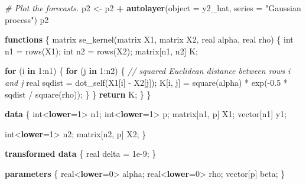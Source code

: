 \documentclass[
]{article}
\newenvironment{Shaded}{\begin{snugshade}}{\end{snugshade}}
\newcommand{\AttributeTok}[1]{\textcolor[rgb]{0.13,0.29,0.53}{#1}}
\newcommand{\CommentTok}[1]{\textcolor[rgb]{0.56,0.35,0.01}{\textit{#1}}}
\newcommand{\ControlFlowTok}[1]{\textcolor[rgb]{0.13,0.29,0.53}{\textbf{#1}}}
\newcommand{\DataTypeTok}[1]{\textcolor[rgb]{0.13,0.29,0.53}{#1}}
\newcommand{\DecValTok}[1]{\textcolor[rgb]{0.00,0.00,0.81}{#1}}
\newcommand{\FloatTok}[1]{\textcolor[rgb]{0.00,0.00,0.81}{#1}}
\newcommand{\FunctionTok}[1]{\textcolor[rgb]{0.13,0.29,0.53}{\textbf{#1}}}
\newcommand{\KeywordTok}[1]{\textcolor[rgb]{0.13,0.29,0.53}{\textbf{#1}}}
\newcommand{\NormalTok}[1]{#1}
\newcommand{\OtherTok}[1]{\textcolor[rgb]{0.56,0.35,0.01}{#1}}
\newcommand{\SpecialCharTok}[1]{\textcolor[rgb]{0.81,0.36,0.00}{\textbf{#1}}}
\newcommand{\StringTok}[1]{\textcolor[rgb]{0.31,0.60,0.02}{#1}}
\begin{document}
\begin{Shaded}
\begin{Highlighting}[]
\CommentTok{\# Plot the forecasts.}
\NormalTok{p2 }\OtherTok{\textless{}{-}}\NormalTok{ p2 }\SpecialCharTok{+} \FunctionTok{autolayer}\NormalTok{(}\AttributeTok{object =}\NormalTok{ y2\_hat, }\AttributeTok{series =} \StringTok{"Gaussian process"}\NormalTok{)}
\NormalTok{p2}
\end{Highlighting}
\end{Shaded}

\begin{Shaded}
\begin{Highlighting}[]
\KeywordTok{functions}\NormalTok{ \{}
  \DataTypeTok{matrix}\NormalTok{ se\_kernel(}\DataTypeTok{matrix}\NormalTok{ X1, }\DataTypeTok{matrix}\NormalTok{ X2, }\DataTypeTok{real}\NormalTok{ alpha, }\DataTypeTok{real}\NormalTok{ rho) \{}
    \DataTypeTok{int}\NormalTok{ n1 = rows(X1);}
    \DataTypeTok{int}\NormalTok{ n2 = rows(X2);}
    \DataTypeTok{matrix}\NormalTok{[n1, n2] K;}

    \ControlFlowTok{for}\NormalTok{ (i }\ControlFlowTok{in} \DecValTok{1}\NormalTok{:n1) \{}
      \ControlFlowTok{for}\NormalTok{ (j }\ControlFlowTok{in} \DecValTok{1}\NormalTok{:n2) \{}
        \CommentTok{// squared Euclidean distance between rows i and j}
        \DataTypeTok{real}\NormalTok{ sqdist = dot\_self(X1[i] {-} X2[j]);}
\NormalTok{        K[i, j] = square(alpha) * exp({-}}\FloatTok{0.5}\NormalTok{ * sqdist / square(rho));}
\NormalTok{      \}}
\NormalTok{    \}}
    \ControlFlowTok{return}\NormalTok{ K;}
\NormalTok{  \}}
\NormalTok{\}}

\KeywordTok{data}\NormalTok{ \{}
  \DataTypeTok{int}\NormalTok{\textless{}}\KeywordTok{lower}\NormalTok{=}\DecValTok{1}\NormalTok{\textgreater{} n1;}
  \DataTypeTok{int}\NormalTok{\textless{}}\KeywordTok{lower}\NormalTok{=}\DecValTok{1}\NormalTok{\textgreater{} p;}
  \DataTypeTok{matrix}\NormalTok{[n1, p] X1;}
  \DataTypeTok{vector}\NormalTok{[n1] y1;}

  \DataTypeTok{int}\NormalTok{\textless{}}\KeywordTok{lower}\NormalTok{=}\DecValTok{1}\NormalTok{\textgreater{} n2;}
  \DataTypeTok{matrix}\NormalTok{[n2, p] X2;}
\NormalTok{\}}

\KeywordTok{transformed data}\NormalTok{ \{}
  \DataTypeTok{real}\NormalTok{ delta = }\FloatTok{1e{-}9}\NormalTok{;}
\NormalTok{\}}

\KeywordTok{parameters}\NormalTok{ \{}
  \DataTypeTok{real}\NormalTok{\textless{}}\KeywordTok{lower}\NormalTok{=}\DecValTok{0}\NormalTok{\textgreater{} alpha;}
  \DataTypeTok{real}\NormalTok{\textless{}}\KeywordTok{lower}\NormalTok{=}\DecValTok{0}\NormalTok{\textgreater{} rho;}
  \DataTypeTok{vector}\NormalTok{[p] beta;}
\NormalTok{\}}


\end{Highlighting}
\end{Shaded}
\end{document}

